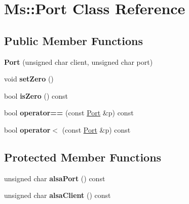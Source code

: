 \hypertarget{class_ms_1_1_port}{}\section{Ms\+:\+:Port Class Reference}
\label{class_ms_1_1_port}
\subsection*{Public Member Functions}
\begin{DoxyCompactItemize}
\item 
\mbox{\label{class_ms_1_1_port_a7e4f9c1bea7157651bdfd9c921f8b9ee}} 
{\bfseries Port} (unsigned char client, unsigned char port)
\item 
\mbox{\label{class_ms_1_1_port_a7ca987cf82c7cc47feba86ae0018e2b5}} 
void {\bfseries set\+Zero} ()
\item 
\mbox{\label{class_ms_1_1_port_acee1802c114e955bf89a2ae35e891fad}} 
bool {\bfseries is\+Zero} () const
\item 
\mbox{\label{class_ms_1_1_port_ae9dadf3edf224541b9cdde4cd64a1734}} 
bool {\bfseries operator==} (const \hyperlink{class_ms_1_1_port}{Port} \&p) const
\item 
\mbox{\label{class_ms_1_1_port_a9560475a3be58a417cfa919f6fd1c79a}} 
bool {\bfseries operator$<$} (const \hyperlink{class_ms_1_1_port}{Port} \&p) const
\end{DoxyCompactItemize}
\subsection*{Protected Member Functions}
\begin{DoxyCompactItemize}
\item 
\mbox{\label{class_ms_1_1_port_ac2d61d6a44f47e47350bac69e11b0aa8}} 
unsigned char {\bfseries alsa\+Port} () const
\item 
\mbox{\label{class_ms_1_1_port_a2eb968e75cdc9ea30536cecebec4f8d6}} 
unsigned char {\bfseries alsa\+Client} () const
\end{DoxyCompactItemize}
